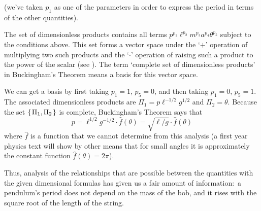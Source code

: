 (we've taken $p_1$ as one of the parameters in order to express
the period in terms of the other quantities).

The set of dimensionless products 
contains all terms $p^{p_1}\ell^{p_2}m^{p_3}a^{p_4}\theta^{p_5}$ subject
to the conditions above.
This set forms a vector space under the 
`$+$' operation of multiplying two such products 
and the `$\cdot$' operation of raising 
such a product to the power of the scalar
(see ).
The term `complete set of dimensionless products' 
in Buckingham's Theorem means a basis for this vector space.

We can get a basis 
by first taking $p_1=1$, $p_5=0$, and then taking $p_1=0$, $p_5=1$.
The associated dimensionless 
products are $\Pi_1=p\ell^{-1/2}g^{1/2}$ and $\Pi_2=\theta$.
Because the set $\mbox{$\{\hspace{0.1em}\Pi_1,\Pi_2\hspace{0.1em}\}$}$ is complete, 
Buckingham's Theorem says that
\begin{equation*}
  p = \ell^{1/2}g^{-1/2}\cdot\hat{f}(\theta) 
    = \sqrt{\ell/g}\cdot\hat{f}(\theta)
\end{equation*}
where $\hat{f}$ is a function that we cannot determine from this analysis
(a first year physics text will show by other means 
that for small angles it is approximately the constant
function $\hat{f}(\theta)=2\pi$).

Thus, analysis of the relationships that are possible between the
quantities with the given dimensional formulas 
has given us a fair amount of information:~a pendulum's period does not 
depend on the mass of the bob, 
and it rises with the square root of the length of the string.

